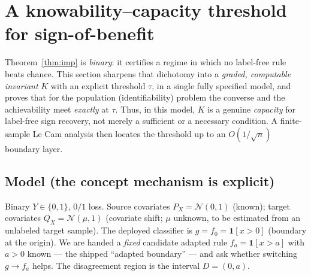 %
%
\section{A knowability--capacity threshold for sign-of-benefit}\label{sec:knowcap}

Theorem~\ref{thm:imp} is \emph{binary}: it certifies a regime in which no
label-free rule beats chance. This section sharpens that dichotomy into a
\emph{graded, computable invariant} $K$ with an explicit threshold $\tau$, in a
single fully specified model, and proves that for the population (identifiability)
problem the converse and the achievability meet \emph{exactly} at $\tau$. Thus, in
this model, $K$ is a genuine \emph{capacity} for label-free sign recovery, not
merely a sufficient or a necessary condition. A finite-sample Le Cam analysis then
locates the threshold up to an $O(1/\sqrt n)$ boundary layer.

\subsection{Model (the concept mechanism is explicit)}\label{sec:knowcap-model}
Binary $Y\in\{0,1\}$, $0/1$ loss. Source covariates $P_X=\mathcal N(0,1)$ (known);
target covariates $Q_X=\mathcal N(\mu,1)$ (covariate shift; $\mu$ unknown, to be
estimated from an unlabeled target sample). The deployed classifier is
$g=f_0=\mathbf 1[x>0]$ (boundary at the origin). We are handed a \emph{fixed}
candidate adapted rule $f_a=\mathbf 1[x>a]$ with $a>0$ known --- the shipped
``adapted boundary'' --- and ask whether switching $g\to f_a$ helps. The
disagreement region is the interval $D=(0,a)$.

